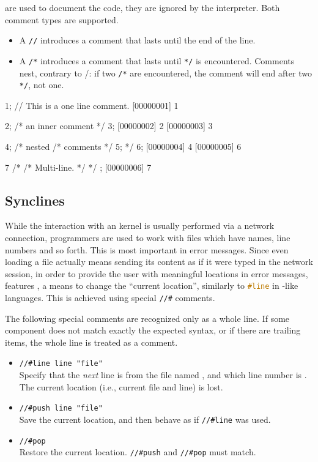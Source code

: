 are used to document the code, they are ignored by the
\us interpreter. Both \Cxx comment types are supported.

\begin{itemize}
\item A \lstinline|//| introduces a comment that lasts until the end
  of the line.
\item A \lstinline|/*| introduces a comment that lasts until \lstinline|*/|
  is encountered. Comments nest, contrary to \C/\Cxx: if two \lstinline|/*|
  are encountered, the comment will end after two \lstinline|*/|, not one.
\end{itemize}

\begin{urbiscript}
1; // This is a one line comment.
[00000001] 1

2; /* an inner comment */ 3;
[00000002] 2
[00000003] 3

4; /* nested /* comments */ 5; */ 6;
[00000004] 4
[00000005] 6

7
  /*
    /*
       Multi-line.
    */
  */
;
[00000006] 7
\end{urbiscript}

\subsection{Synclines}
\label{sec:specs:synclines}

While the interaction with an \us kernel is usually performed via a
network connection, programmers are used to work with files which have
names, line numbers and so forth.  This is most important in error
messages.  Since even loading a file actually means sending its
content as if it were typed in the network session, in order to
provide the user with meaningful locations in error messages, \us
features , a means to change the ``current
location'', similarly to \lstinline[language=C]|#line| in \C-like
languages.  This is achieved using special \lstinline|//#| comments.

The following special comments are recognized only as a whole line.
If some component does not match exactly the expected syntax, or if
there are trailing items, the whole line is treated as a comment.
\begin{itemize}
\item \lstinline|//#line line "file"|\\
  Specify that the \emph{next} line is from the file named ,
  and which line number is .  The current location (i.e.,
  current file and line) is lost.

\item \lstinline|//#push line "file"|\\
  Save the current location, and then behave as if \lstinline|//#line|
  was used.

\item \lstinline|//#pop|\\
  Restore the current location.  \lstinline|//#push| and
  \lstinline|//#pop| must match.
\end{itemize}


